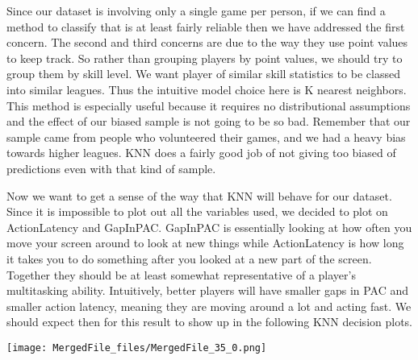 \documentclass[letterpaper,10pt,english]{/usr/share/sphinx/texinputs/sphinxhowto}
\newenvironment{InvisibleVerbatim}
        {\begin{mdframed}[leftmargin=0.1\linewidth,innerleftmargin=3pt,innerrightmargin=3pt, userdefinedwidth=1\linewidth, linewidth=0pt, linecolor=white, usetwoside=false]}
        {\end{mdframed}}
\begin{document}
Since our dataset is involving only a single game per person, if we can
find a method to classify that is at least fairly reliable then we have
addressed the first concern. The second and third concerns are due to
the way they use point values to keep track. So rather than grouping
players by point values, we should try to group them by skill level. We
want player of similar skill statistics to be classed into similar
leagues. Thus the intuitive model choice here is K nearest neighbors.
This method is especially useful because it requires no distributional
assumptions and the effect of our biased sample is not going to be so
bad. Remember that our sample came from people who volunteered their
games, and we had a heavy bias towards higher leagues. KNN does a fairly
good job of not giving too biased of predictions even with that kind of
sample.

Now we want to get a sense of the way that KNN will behave for our
dataset. Since it is impossible to plot out all the variables used, we
decided to plot on ActionLatency and GapInPAC. GapInPAC is essentially
looking at how often you move your screen around to look at new things
while ActionLatency is how long it takes you to do something after you
looked at a new part of the screen. Together they should be at least
somewhat representative of a player's multitasking ability. Intuitively,
better players will have smaller gaps in PAC and smaller action latency,
meaning they are moving around a lot and acting fast. We should expect
then for this result to show up in the following KNN decision plots.


    

        
        

            
                \begin{InvisibleVerbatim}
                \vspace{-0.5\baselineskip}
    \begin{center}
    \texttt{[image: MergedFile\_files/MergedFile\_35\_0.png]}
    \par
    \end{center}
    
            \end{InvisibleVerbatim}
            
\end{document}
